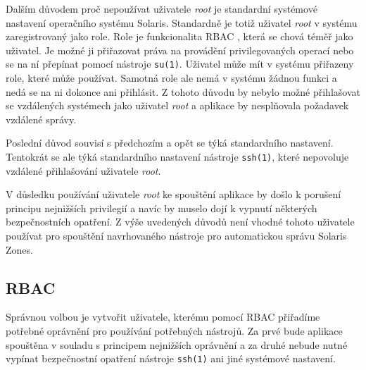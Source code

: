 Dalším důvodem proč nepoužívat uživatele \textit{root} je standardní systémové nastavení operačního systému Solaris. Standardně
je totiž uživatel \textit{root} v systému zaregistrovaný jako role. Role je funkcionalita RBAC \cite{oracle:solaris:desing:rbac},
která se chová téměř jako uživatel. Je možné ji přiřazovat práva na provádění privilegovaných operací nebo se na ní přepínat pomocí
nástroje \verb|su(1)|. Uživatel může mít v systému přiřazeny role, které může používat. Samotná role ale nemá v systému žádnou
funkci a nedá se na ni dokonce ani přihlásit. Z tohoto důvodu by nebylo možné přihlašovat se vzdálených systémech jako uživatel
\textit{root} a aplikace by nesplňovala požadavek vzdálené správy.

Poslední důvod souvisí s předchozím a opět se týká standardního nastavení. Tentokrát se ale týká standardního nastavení nástroje
\verb|ssh(1)|, které nepovoluje vzdálené přihlašování uživatele \textit{root}.

V důsledku používání uživatele \textit{root} ke spouštění aplikace by došlo k porušení principu nejnižších privilegií 
\cite{cvut:presentations:least_user_privilege} a navíc by muselo dojí k vypnutí některých bezpečnostních opatření. Z výše uvedených
důvodů není vhodné tohoto uživatele používat pro spouštění navrhovaného nástroje pro automatickou správu Solaris Zones.
\subsection{RBAC}
\label{chapter:design:security:rbac}
Správnou volbou je vytvořit uživatele, kterému pomocí RBAC přiřadíme potřebné oprávnění pro používání potřebných nástrojů.
Za prvé bude aplikace spouštěna v souladu s principem nejnižších oprávnění a za druhé nebude nutné vypínat bezpečnostní
opatření nástroje \verb|ssh(1)| ani jiné systémové nastavení.